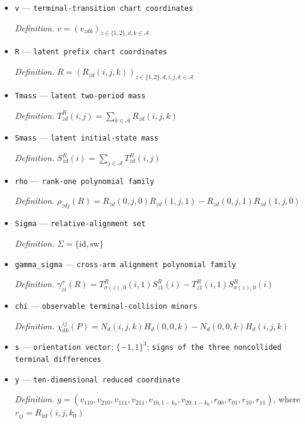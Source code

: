 \documentclass{article}
\begin{document}
\begin{itemize}
  \item \texttt{v} --- \texttt{terminal-\allowbreak{}transition chart coordinates}
  \par\smallskip\noindent\emph{Definition.} \(v=(v_{zdk})_{z\in\{1,2\},d,k\in\mathcal A}\)
  \item \texttt{R} --- \texttt{latent prefix chart coordinates}
  \par\smallskip\noindent\emph{Definition.} \(R=(R_{zd}(i,j,k))_{z\in\{1,2\},d,i,j,k\in\mathcal A}\)
  \item \texttt{Tmass} --- \texttt{latent two-\allowbreak{}period mass}
  \par\smallskip\noindent\emph{Definition.} \(T_{zd}^{R}(i,j)=\sum_{k\in\mathcal A}R_{zd}(i,j,k)\)
  \item \texttt{Smass} --- \texttt{latent initial-\allowbreak{}state mass}
  \par\smallskip\noindent\emph{Definition.} \(S_{zd}^{R}(i)=\sum_{j\in\mathcal A}T_{zd}^{R}(i,j)\)
  \item \texttt{rho} --- \texttt{rank-\allowbreak{}one polynomial family}
  \par\smallskip\noindent\emph{Definition.} \(\rho_{zdj}(R)=R_{zd}(0,j,0)R_{zd}(1,j,1)-R_{zd}(0,j,1)R_{zd}(1,j,0)\)
  \item \texttt{Sigma} --- \texttt{relative-\allowbreak{}alignment set}
  \par\smallskip\noindent\emph{Definition.} \(\Sigma=\{\mathrm{id},\mathrm{sw}\}\)
  \item \texttt{gamma\_\allowbreak{}sigma} --- \texttt{cross-\allowbreak{}arm alignment polynomial family}
  \par\smallskip\noindent\emph{Definition.} \(\gamma_{zi}^{\sigma}(R)=T_{\sigma(z),0}^{R}(i,1)S_{z1}^{R}(i)-T_{z1}^{R}(i,1)S_{\sigma(z),0}^{R}(i)\)
  \item \texttt{chi} --- \texttt{observable terminal-\allowbreak{}collision minors}
  \par\smallskip\noindent\emph{Definition.} \(\chi_{dk}^{ij}(P)=N_d(i,j,k)H_d(0,0,k)-N_d(0,0,k)H_d(i,j,k)\)
  \item \texttt{s} --- \texttt{orientation vector}; \(\{-1,1\}^{3}\); \texttt{signs of the three noncollided terminal differences}
  \item \texttt{y} --- \texttt{ten-\allowbreak{}dimensional reduced coordinate}
  \par\smallskip\noindent\emph{Definition.} \(y=(v_{110},v_{210},v_{111},v_{211},v_{10,1-k_0},v_{20,1-k_0},r_{00},r_{01},r_{10},r_{11})\), where \(r_{ij}=R_{10}(i,j,k_0)\)

\end{itemize}
\end{document}
